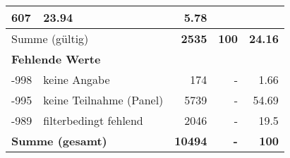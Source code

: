 \begin{longtable}{lXrrr}
       \num{607} &
       \num[round-mode=places,round-precision=2]{23.94} &
         \num[round-mode=places,round-precision=2]{5.78} \\
     \midrule
     \multicolumn{2}{l}{Summe (gültig)} &
       \textbf{\num{2535}} &
     \textbf{\num{100}} &
       \textbf{\num[round-mode=places,round-precision=2]{24.16}} \\
     \multicolumn{5}{l}{\textbf{Fehlende Werte}}\\
       -998 &
       keine Angabe &
         \num{174} &
        - &
         \num[round-mode=places,round-precision=2]{1.66} \\
       -995 &
       keine Teilnahme (Panel) &
         \num{5739} &
        - &
         \num[round-mode=places,round-precision=2]{54.69} \\
       -989 &
       filterbedingt fehlend &
         \num{2046} &
        - &
         \num[round-mode=places,round-precision=2]{19.5} \\
     \midrule
     \multicolumn{2}{l}{\textbf{Summe (gesamt)}} &
          \textbf{\num{10494}} &
        \textbf{-} &
        \textbf{\num{100}} \\
     \bottomrule
     \end{longtable}
     
